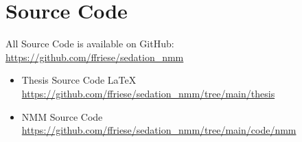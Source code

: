 \chapter{Source Code}\label{ch:source_code}

All Source Code is available on GitHub: \\
 \url{https://github.com/ffriese/sedation_nmm}
\begin{itemize}
    \item \textcolor{pyratesdarkred}{} Thesis Source Code \textcolor{modernblue}{\LaTeX{}} \\
        \url{https://github.com/ffriese/sedation_nmm/tree/main/thesis}
    \item \textcolor{pyratesdarkred}{} NMM Source Code \textcolor{modernblue}{} \\
        \url{https://github.com/ffriese/sedation_nmm/tree/main/code/nmm}
\end{itemize}

